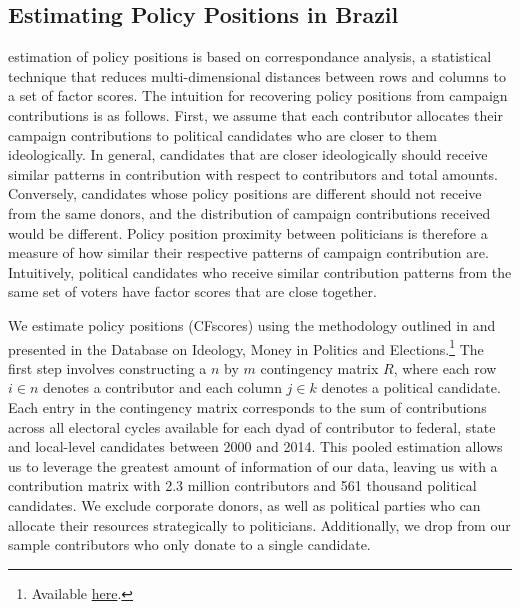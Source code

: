 \documentclass[12pt,english]{article}
\numberwithin{equation}{section}
\theoremstyle{plain}
\theoremstyle{remark}
\theoremstyle{plain}
\begin{document}
\subsection{Estimating Policy Positions in Brazil}

 estimation of policy positions is based on correspondance analysis, a statistical technique that reduces multi-dimensional distances between rows and columns to a set of factor scores. The intuition for recovering policy positions from campaign contributions is as follows. First, we assume that each contributor allocates their campaign contributions to political candidates who are closer to them ideologically. In general, candidates that are closer ideologically should receive similar patterns in contribution with respect to contributors and total amounts. Conversely, candidates whose policy positions are different should not receive from the same donors, and the distribution of campaign contributions received would be different. Policy position proximity between politicians is therefore a measure of how similar their respective patterns of campaign contribution are. Intuitively, political candidates who receive similar contribution patterns from the same set of voters have factor scores that are close together.

We estimate policy positions (CFscores) using the methodology outlined in  and presented in the Database on Ideology, Money in Politics and Elections.\footnote{Available \href{https://web.stanford.edu/~bonica/data.html}{here}.} The first step involves constructing a $n$ by $m$ contingency matrix $R$, where each row $i \in n$ denotes a contributor and each column $j \in k$ denotes a political candidate. Each entry in the contingency matrix corresponds to the sum of contributions across all electoral cycles available for each dyad of contributor to federal, state and local-level candidates between 2000 and 2014. This pooled estimation allows us to leverage the greatest amount of information  of our data, leaving us with a contribution matrix with 2.3 million contributors and 561 thousand political candidates. We exclude corporate donors, as well as political parties who can allocate their resources strategically to politicians. Additionally, we drop from our sample contributors who only donate to a single candidate.
\end{document}
